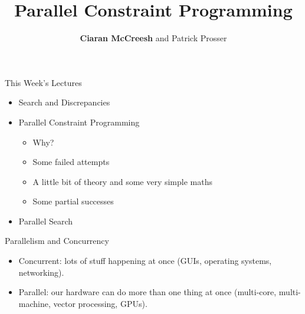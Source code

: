 \documentclass{beamer}
\title{Parallel Constraint Programming}
\author[Ciaran McCreesh and Patrick Prosser]{\textbf{Ciaran McCreesh} and Patrick Prosser}
\begin{document}
{
    \begin{frame}
        \titlepage
    \end{frame}
}

\begin{frame}{This Week's Lectures}
    \begin{itemize}
        \item Search and Discrepancies
        \item \textcolor{uofgcobalt}{Parallel Constraint Programming}
        \begin{itemize}
            \item Why?
            \item Some failed attempts
            \item A little bit of theory and some very simple maths
            \item Some partial successes
        \end{itemize}
        \item Parallel Search
    \end{itemize}
\end{frame}

\begin{frame}{Parallelism and Concurrency}
    \begin{itemize}
        \item Concurrent: lots of stuff happening at once (GUIs, operating systems, networking).

        \item Parallel: our hardware can do more than one thing at once (multi-core, multi-machine,
            vector processing, GPUs).
    \end{itemize}
\end{frame}
\end{document}
